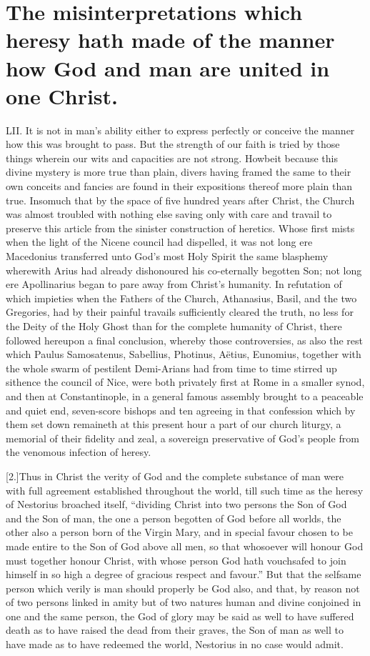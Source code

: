 \section*{The misinterpretations which heresy hath made of the manner how God and man are united in one Christ.}
LII. It is not in man’s ability either to express perfectly or conceive the manner how this was brought to pass. But the strength of our faith is tried by those things wherein our wits and capacities are not strong. Howbeit because this divine mystery is more true than plain, divers having framed the same to their own conceits and fancies are found in their expositions thereof more plain than true. Insomuch that by the space of five hundred years after Christ, the Church was almost  troubled with nothing else saving only with care and travail to preserve this article from the sinister construction of heretics.
 Whose first mists when the light of the Nicene council had dispelled, it was not long ere Macedonius transferred unto God’s most Holy Spirit the same blasphemy wherewith Arius had already dishonoured his co-eternally begotten Son; not long ere Apollinarius began to pare away from Christ’s humanity. In refutation of which impieties when the Fathers of the Church, Athanasius, Basil, and the two Gregories, had by their painful travails sufficiently cleared the truth, no less for the Deity of the Holy Ghost than for the complete humanity of Christ, there followed hereupon a final conclusion, whereby those controversies, as also the rest which Paulus Samosatenus, Sabellius, Photinus, Aëtius, Eunomius, together with the whole swarm of pestilent Demi-Arians had from time to time stirred up sithence the council of Nice, were both privately first at Rome in a smaller synod, and then at Constantinople, in a general famous assembly brought to a peaceable and quiet end, seven-score bishops and ten agreeing in that confession which by them set down remaineth at this present hour a part of our church liturgy, a memorial of their fidelity and zeal, a sovereign preservative of God’s people from the venomous infection of heresy.

[2.]Thus in Christ the verity of God and the complete substance of man were with full agreement established throughout the world, till such time as the heresy of Nestorius broached itself, “dividing Christ into two persons the Son of God and  the Son of man,
 the one a person begotten of God before all worlds, the other also a person born of the Virgin Mary, and in special favour chosen to be made entire to the Son of God above all men, so that whosoever will honour God must together honour Christ, with whose person God hath vouchsafed to join himself in so high a degree of gracious respect and favour.” But that the selfsame person which verily is man should properly be God also, and that, by reason not of two persons linked in amity but of two natures human and divine conjoined in one and the same person, the God of glory may be said as well to have suffered death as to have raised the dead from their graves, the Son of man as well to have made as to have redeemed the world, Nestorius in no case would admit.

